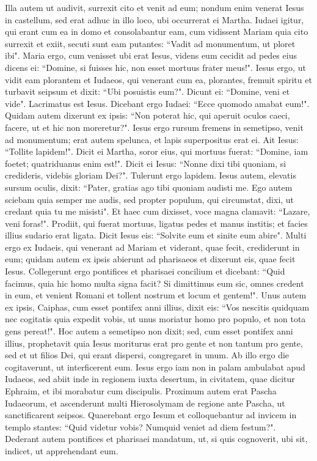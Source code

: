 \begin{biblechapter}
\verse Illa autem ut audivit, surrexit cito et venit ad eum; 
\verse nondum enim venerat Iesus in castellum, sed erat adhuc in illo loco, ubi occurrerat ei Martha. 
\verse Iudaei igitur, qui erant cum ea in domo et consolabantur eam, cum vidissent Mariam quia cito surrexit et exiit, secuti sunt eam putantes: “Vadit ad monumentum, ut ploret ibi". 
\verse Maria ergo, cum venisset ubi erat Iesus, videns eum cecidit ad pedes eius dicens ei: “Domine, si fuisses hic, non esset mortuus frater meus!". 
\verse Iesus ergo, ut vidit eam plorantem et Iudaeos, qui venerant cum ea, plorantes, fremuit spiritu et turbavit seipsum 
\verse et dixit: “Ubi posuistis eum?". Dicunt ei: “Domine, veni et vide". 
\verse Lacrimatus est Iesus. 
\verse Dicebant ergo Iudaei: “Ecce quomodo amabat eum!". 
\verse Quidam autem dixerunt ex ipsis: “Non poterat hic, qui aperuit oculos caeci, facere, ut et hic non moreretur?". 
\verse Iesus ergo rursum fremens in semetipso, venit ad monumentum; erat autem spelunca, et lapis superpositus erat ei. 
\verse Ait Iesus: “Tollite lapidem!". Dicit ei Martha, soror eius, qui mortuus fuerat: “Domine, iam foetet; quatriduanus enim est!". 
\verse Dicit ei Iesus: “Nonne dixi tibi quoniam, si credideris, videbis gloriam Dei?". 
\verse Tulerunt ergo lapidem. Iesus autem, elevatis sursum oculis, dixit: “Pater, gratias ago tibi quoniam audisti me. 
\verse Ego autem sciebam quia semper me audis, sed propter populum, qui circumstat, dixi, ut credant quia tu me misisti". 
\verse Et haec cum dixisset, voce magna clamavit: “Lazare, veni foras!". 
\verse Prodiit, qui fuerat mortuus, ligatus pedes et manus institis; et facies illius sudario erat ligata. Dicit Iesus eis: “Solvite eum et sinite eum abire". 
\verse Multi ergo ex Iudaeis, qui venerant ad Mariam et viderant, quae fecit, crediderunt in eum;  
\verse quidam autem ex ipsis abierunt ad pharisaeos et dixerunt eis, quae fecit Iesus. 
\verse Collegerunt ergo pontifices et pharisaei concilium et dicebant: “Quid facimus, quia hic homo multa signa facit? 
\verse Si dimittimus eum sic, omnes credent in eum, et venient Romani et tollent nostrum et locum et gentem!". 
\verse Unus autem ex ipsis, Caiphas, cum esset pontifex anni illius, dixit eis: “Vos nescitis quidquam 
\verse nec cogitatis quia expedit vobis, ut unus moriatur homo pro populo, et non tota gens pereat!". 
\verse Hoc autem a semetipso non dixit; sed, cum esset pontifex anni illius, prophetavit quia Iesus moriturus erat pro gente 
\verse et non tantum pro gente, sed et ut filios Dei, qui erant dispersi, congregaret in unum. 
\verse Ab illo ergo die cogitaverunt, ut interficerent eum. 
\verse Iesus ergo iam non in palam ambulabat apud Iudaeos, sed abiit inde in regionem iuxta desertum, in civitatem, quae dicitur Ephraim, et ibi morabatur cum discipulis. 
\verse Proximum autem erat Pascha Iudaeorum, et ascenderunt multi Hierosolymam de regione ante Pascha, ut sanctificarent seipsos. 
\verse Quaerebant ergo Iesum et colloquebantur ad invicem in templo stantes: “Quid videtur vobis? Numquid veniet ad diem festum?". 
\verse Dederant autem pontifices et pharisaei mandatum, ut, si quis cognoverit, ubi sit, indicet, ut apprehendant eum. 
\end{biblechapter}

